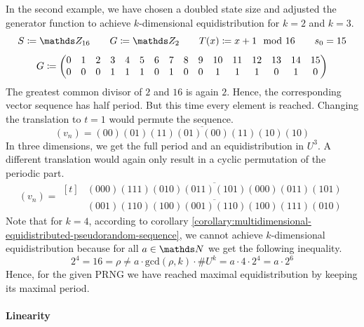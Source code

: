 \documentclass{stdlocal}
\begin{document}
    \noindent
    In the second example, we have chosen a doubled state size and adjusted the generator function to achieve $k$-dimensional equidistribution for $k=2$ and $k=3$.
    \[
      S \define \setInteger_{16}
      \separate
      G \define \setInteger_2
      \separate
      T(x) \define x + 1 \mod 16
      \separate
      s_0 = 15
    \]
    \[
      \setcounter{MaxMatrixCols}{20}
      G \define
      \begin{pmatrix}
        0 & 1 & 2 & 3 & 4 & 5 & 6 & 7 & 8 & 9 & 10 & 11 & 12 & 13 & 14 & 15 \\
        0 & 0 & 0 & 1 & 1 & 1 & 0 & 1 & 0 & 0 & 1 & 1 & 1 & 0 & 1 & 0
      \end{pmatrix}
    \]
    The greatest common divisor of $2$ and $16$ is again $2$.
    Hence, the corresponding vector sequence has half period.
    But this time every element is reached.
    Changing the translation to $t=1$ would permute the sequence.
    \[
      (v_n) = \overline{(00)(01)(11)(01)(00)(11)(10)(10)}
    \]
    In three dimensions, we get the full period and an equidistribution in $U^3$.
    A different translation would again only result in a cyclic permutation of the periodic part.
    \[
      (v_n) =
      \begin{aligned}[t]
        &\overline{(000)(111)(010)(011)(101)(000)(011)(101)} \\
        &\overline{(001)(110)(100)(001)(110)(100)(111)(010)}
      \end{aligned}
    \]
    Note that for $k=4$, according to corollary \ref{corollary:multidimensional-equidistributed-pseudorandom-sequence}, we cannot achieve $k$-dimensional equidistribution because for all $a\in\setNatural$ we get the following inequality.
    \[
      2^4 = 16 = ρ \neq a\cdot\mathrm{gcd}(ρ,k)\cdot\# U^k = a \cdot 4 \cdot 2^4 = a\cdot 2^6
    \]
    Hence, for the given PRNG we have reached maximal equidistribution by keeping its maximal period.


    \paragraph{Linearity}
    \begin{definition}[Linearity]

    \end{definition}
\end{document}
